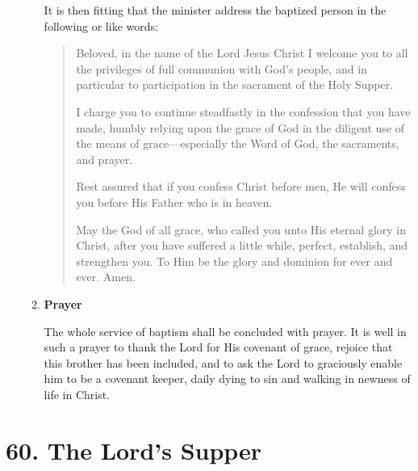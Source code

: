 \documentclass[
]{book}
\begin{document}
\begin{enumerate}
\begin{enumerate}
    It is then fitting that the minister address the baptized person in the following or like words:

    \begin{quote}
    Beloved, in the name of the Lord Jesus Christ I welcome you to all the privileges of full communion with God's people, and in particular to participation in the sacrament of the Holy Supper.

    I charge you to continue steadfastly in the confession that you have made, humbly relying upon the grace of God in the diligent use of the means of grace---especially the Word of God, the sacraments, and prayer.

    Rest assured that if you confess Christ before men, He will confess you before His Father who is in heaven.

    May the God of all grace, who called you unto His eternal glory in Christ, after you have suffered a little while, perfect, establish, and strengthen you. To Him be the glory and dominion for ever and ever. Amen.
    \end{quote}
  \item
    \textbf{Prayer}

    The whole service of baptism shall be concluded with prayer. It is well in such a prayer to thank the Lord for His covenant of grace, rejoice that this brother has been included, and to ask the Lord to graciously enable him to be a covenant keeper, daily dying to sin and walking in newness of life in Christ.
  \end{enumerate}
\end{enumerate}

\hypertarget{the-lords-supper}{%
\section*{60. The Lord's Supper}\label{the-lords-supper}}

\protect\hypertarget{chapter-slug-60-the-lords-supper}{\href{}{}}
\end{document}
